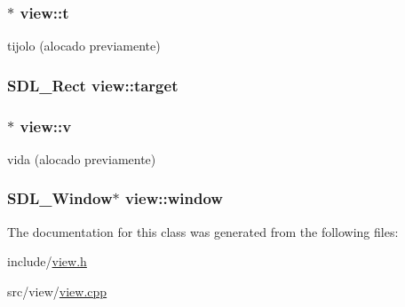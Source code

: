 \subsubsection[{\texorpdfstring{t}{t}}]{$\ast$ view\+::t\hspace{0.3cm}{\ttfamily [private]}}\hypertarget{classview_a952fdfafefca2c0bfc8b17647a5706be}{}\label{classview_a952fdfafefca2c0bfc8b17647a5706be}
tijolo (alocado previamente) 
\subsubsection[{\texorpdfstring{target}{target}}]{\setlength{\rightskip}{0pt plus 5cm}S\+D\+L\+\_\+\+Rect view\+::target\hspace{0.3cm}{\ttfamily [private]}}\hypertarget{classview_a49a628eedba666db008f8c07b96e3a51}{}\label{classview_a49a628eedba666db008f8c07b96e3a51}
\subsubsection[{\texorpdfstring{v}{v}}]{$\ast$ view\+::v\hspace{0.3cm}{\ttfamily [private]}}\hypertarget{classview_ae0f8e281f5f7937d84f435437ce03546}{}\label{classview_ae0f8e281f5f7937d84f435437ce03546}
vida (alocado previamente) 
\subsubsection[{\texorpdfstring{window}{window}}]{\setlength{\rightskip}{0pt plus 5cm}S\+D\+L\+\_\+\+Window$\ast$ view\+::window\hspace{0.3cm}{\ttfamily [private]}}\hypertarget{classview_ade09c2dbabd1bf59ffaf625156c514f0}{}\label{classview_ade09c2dbabd1bf59ffaf625156c514f0}


The documentation for this class was generated from the following files\+:\begin{DoxyCompactItemize}
\item 
include/\hyperlink{view_8h}{view.\+h}\item 
src/view/\hyperlink{view_8cpp}{view.\+cpp}\end{DoxyCompactItemize}
